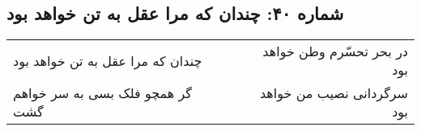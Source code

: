 \begin{center}
\section*{شماره ۴۰: چندان که مرا عقل به تن خواهد بود}
\label{sec:040}
\begin{longtable}{l p{0.5cm} r}
چندان که مرا عقل به تن خواهد بود
&&
در بحر تحسّرم وطن خواهد بود
\\
گر همچو فلک بسی به سر خواهم گشت
&&
سرگردانی نصیب من خواهد بود
\\
\end{longtable}
\end{center}
